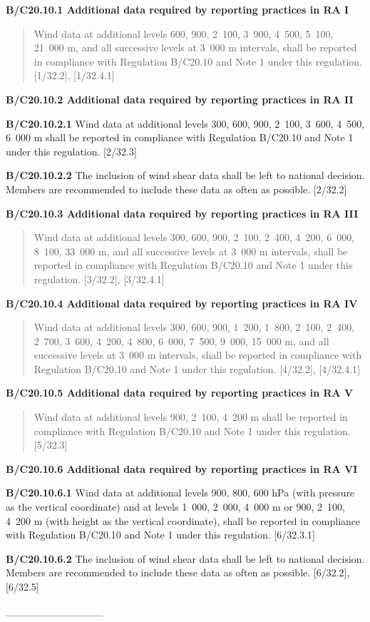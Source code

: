 \textbf{B/C20.10.1 Additional data required by reporting practices in RA I}

\begin{quote}
Wind data at additional levels 600, 900, 2~100, 3~900, 4~500, 5~100, 21~000 m, and all successive levels at 3~000 m intervals, shall be reported in compliance with Regulation B/C20.10 and Note 1 under this regulation. {[}1/32.2{]}, {[}1/32.4.1{]}
\end{quote}

\textbf{B/C20.10.2 Additional data required by reporting practices in RA II}

\textbf{B/C20.10.2.1} Wind data at additional levels 300, 600, 900, 2~100, 3~600, 4~500, 6~000 m shall be reported in compliance with Regulation B/C20.10 and Note 1 under this regulation. {[}2/32.3{]}

\textbf{B/C20.10.2.2} The inclusion of wind shear data shall be left to national decision. Members are recommended to include these data as often as possible. {[}2/32.2{]}

\textbf{B/C20.10.3 Additional data required by reporting practices in RA III}

\begin{quote}
Wind data at additional levels 300, 600, 900, 2~100, 2~400, 4~200, 6~000, 8~100, 33~000 m, and all successive levels at 3~000 m intervals, shall be reported in compliance with Regulation B/C20.10 and Note 1 under this regulation. {[}3/32.2{]}, {[}3/32.4.1{]}
\end{quote}

\textbf{B/C20.10.4 Additional data required by reporting practices in RA IV}

\begin{quote}
Wind data at additional levels 300, 600, 900, 1~200, 1~800, 2~100, 2~400, 2~700, 3~600, 4~200, 4~800, 6~000, 7~500, 9~000, 15~000 m, and all successive levels at 3~000 m intervals, shall be reported in compliance with Regulation B/C20.10 and Note 1 under this regulation. {[}4/32.2{]}, {[}4/32.4.1{]}
\end{quote}

\textbf{B/C20.10.5 Additional data required by reporting practices in RA V}

\begin{quote}
Wind data at additional levels 900, 2~100, 4~200 m shall be reported in compliance with Regulation B/C20.10 and Note 1 under this regulation. {[}5/32.3{]}
\end{quote}

\textbf{B/C20.10.6 Additional data required by reporting practices in RA VI}

\textbf{B/C20.10.6.1} Wind data at additional levels 900, 800, 600 hPa (with pressure as the vertical coordinate) and at levels 1~000, 2~000, 4~000 m or 900, 2~100, 4~200 m (with height as the vertical coordinate), shall be reported in compliance with Regulation B/C20.10 and Note 1 under this regulation. {[}6/32.3.1{]}

\textbf{B/C20.10.6.2} The inclusion of wind shear data shall be left to national decision. Members are recommended to include these data as often as possible. {[}6/32.2{]}, {[}6/32.5{]}

\_\_\_\_\_\_\_\_\_\_\_\_\_
